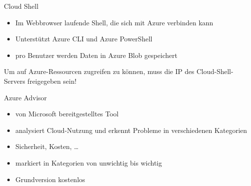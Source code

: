 \begin{flashcard}[Definition]{Cloud Shell}
    \begin{itemize}
        \item Im Webbrowser laufende Shell, die sich mit Azure verbinden kann
        \item Unterstützt Azure CLI und Azure PowerShell
        \item pro Benutzer werden Daten in Azure Blob gespeichert
    \end{itemize}

    \vspace{5mm}
    Um auf Azure-Ressourcen zugreifen zu können, muss die IP des Cloud-Shell-Servers freigegeben sein!
\end{flashcard}

\begin{flashcard}[Describe]{Azure Advisor}
    \begin{itemize}
        \item von Microsoft bereitgestelltes Tool
        \item analysiert Cloud-Nutzung und erkennt Probleme in verschiedenen Kategorien
        \item Sicherheit, Kosten, \ldots
        \item markiert in Kategorien von unwichtig bis wichtig
        \item Grundversion kostenlos
    \end{itemize}

\end{flashcard}
